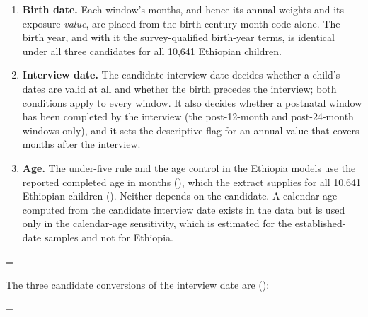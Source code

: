 \begin{enumerate}
\def\labelenumi{\arabic{enumi}.}
\tightlist
\item
  \textbf{Birth date.} Each window's months, and hence its annual weights and its exposure \emph{value}, are placed from the birth century-month code alone. The birth year, and with it the survey-qualified birth-year terms, is identical under all three candidates for all 10,641 Ethiopian children.
\item
  \textbf{Interview date.} The candidate interview date decides whether a child's dates are valid at all and whether the birth precedes the interview; both conditions apply to every window. It also decides whether a postnatal window has been completed by the interview (the post-12-month and post-24-month windows only), and it sets the descriptive flag for an annual value that covers months after the interview.
\item
  \textbf{Age.} The under-five rule and the age control in the Ethiopia models use the reported completed age in months (), which the extract supplies for all 10,641 Ethiopian children (). Neither depends on the candidate. A calendar age computed from the candidate interview date exists in the data but is used only in the calendar-age sensitivity, which is estimated for the established-date samples and not for Ethiopia.
\end{enumerate}

\par\endgroup

\begingroup\edef\ThesisSavedIndent{\the\parindent}\raggedright\parindent=\ThesisSavedIndent\relax{}

The three candidate conversions of the interview date are ():

\par\endgroup

\begingroup\edef\ThesisSavedIndent{\the\parindent}\raggedright\parindent=\ThesisSavedIndent\relax{}

